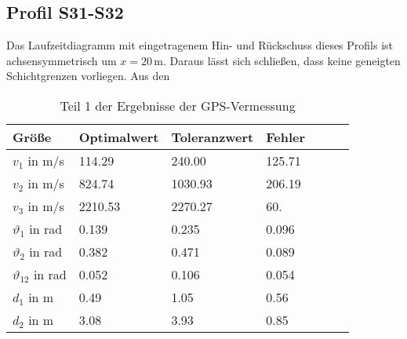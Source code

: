 \subsection{Profil S31-S32}

Das Laufzeitdiagramm mit eingetragenem Hin- und Rückschuss dieses Profils ist achsensymmetrisch um $x=20$\,m. Daraus lässt sich schließen, dass keine geneigten Schichtgrenzen vorliegen. Aus den 



\begin{table}[!ht]
\centering
\caption{Teil 1 der Ergebnisse der GPS-Vermessung}
\label{tab:gps1}
\begin{tabular}{lllllll}
\toprule
Größe   & Optimalwert   & Toleranzwert   & Fehler \\
\midrule
$v_1$ in m/s & 114.29 & 240.00 &  125.71\\
$v_2$ in m/s & 824.74 & 1030.93 & 206.19 \\
$v_3$ in m/s & 2210.53 & 2270.27 & 60. \\
$\vartheta_1$ in rad & 0.139 & 0.235 & 0.096  \\
$\vartheta_2$ in rad & 0.382 & 0.471 & 0.089 \\
$\vartheta_{12}$ in rad & 0.052 & 0.106 & 0.054 \\
$d_1$ in m & 0.49 & 1.05 & 0.56 \\
$d_2$ in m & 3.08 & 3.93 & 0.85 \\

\bottomrule
\end{tabular}
\end{table}







